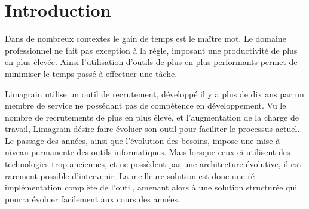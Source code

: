\cleardoublepage

\chapter*{Introduction}





Dans de nombreux contextes le gain de temps est le maître mot.
Le domaine professionnel ne fait pas exception à la règle, imposant une productivité de plus en plus élevée.
Ainsi l'utilisation d'outils de plus en plus performants permet de minimiser le temps passé à effectuer une tâche.


Limagrain utilise un outil de recrutement, développé il y a plus de dix ans par un membre de service ne possédant pas de compétence en développement.
Vu le nombre de recrutements de plus en plus élevé, et  l'augmentation de la charge de travail, Limagrain désire faire évoluer son outil pour faciliter le processus actuel.
\\


Le passage des années, ainsi que l'évolution des besoins, impose une mise à niveau permanente des outils informatiques.
Mais lorsque ceux-ci utilisent des technologies trop anciennes, et ne possèdent pas une architecture évolutive, il est rarement possible d'intervenir.
La meilleure solution est donc une ré-implémentation complète de l'outil, amenant alors à une solution structurée qui pourra évoluer facilement aux cours des années.
\\


